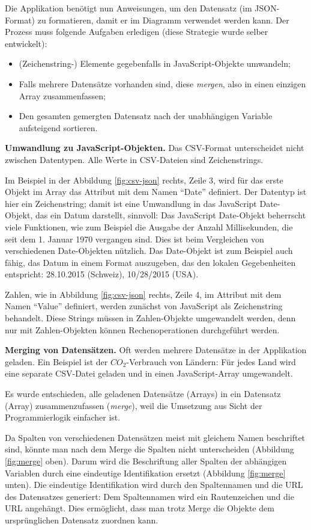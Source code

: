 Die Applikation benötigt nun Anweisungen, um den Datensatz (im JSON-Format) zu formatieren, damit er im Diagramm verwendet werden kann. Der Prozess muss folgende Aufgaben erledigen (diese Strategie wurde selber entwickelt):

\begin{itemize}
	\item (Zeichenstring-) Elemente gegebenfalls in JavaScript-Objekte umwandeln;
	\item Falls mehrere Datensätze vorhanden sind, diese \textit{mergen}, also in einen einzigen Array zusammenfassen;
	\item Den gesamten gemergten Datensatz nach der unabhängigen Variable aufsteigend sortieren.
\end{itemize}

\textbf{Umwandlung zu JavaScript-Objekten.} Das CSV-Format unterscheidet nicht zwischen Datentypen. Alle Werte in CSV-Dateien sind Zeichenstrings.

Im Beispiel in der Abbildung \ref{fig:csv-json} rechts, Zeile 3, wird für das erste Objekt im Array das Attribut mit dem Namen "`Date"' definiert. Der Datentyp ist hier ein Zeichenstring; damit ist eine Umwandlung in das JavaScript Date-Objekt, das ein Datum darstellt, sinnvoll: Das JavaScript Date-Objekt beherrscht viele Funktionen, wie zum Beispiel die Ausgabe der Anzahl Millisekunden, die seit dem 1. Januar 1970 vergangen sind. Dies ist beim Vergleichen von verschiedenen Date-Objekten nützlich. Das Date-Objekt ist zum Beispiel auch fähig, das Datum in einem Format auszugeben, das den lokalen Gegebenheiten entspricht: 28.10.2015 (Schweiz), 10/28/2015 (USA).

Zahlen, wie in Abbildung \ref{fig:csv-json} rechts, Zeile 4, im Attribut mit dem Namen "`Value"' definiert, werden zunächst von JavaScript als Zeichenstring behandelt. Diese Strings müssen in Zahlen-Objekte umgewandelt werden, denn nur mit Zahlen-Objekten können Rechenoperationen durchgeführt werden.

\textbf{Merging von Datensätzen.} Oft werden mehrere Datensätze in der Applikation geladen. Ein Beispiel ist der $CO_2$-Verbrauch von Ländern: Für jedes Land wird eine separate CSV-Datei geladen und in einen JavaScript-Array umgewandelt.

Es wurde entschieden, alle geladenen Datensätze (Arrays) in ein Datensatz (Array) zusammenzufassen (\textit{merge}), weil die Umsetzung aus Sicht der Programmierlogik einfacher ist. 

Da Spalten von verschiedenen Datensätzen meist mit gleichem Namen beschriftet sind, könnte man nach dem Merge die Spalten nicht unterscheiden (Abbildung \ref{fig:merge} oben). Darum wird die Beschriftung aller Spalten der abhängigen Variablen durch eine eindeutige Identifikation ersetzt (Abbildung \ref{fig:merge} unten). Die eindeutige Identifikation wird durch den Spaltennamen und die URL des Datensatzes generiert: Dem Spaltennamen wird ein Rautenzeichen und die URL angehängt. Dies ermöglicht, dass man trotz Merge die Objekte dem ursprünglichen Datensatz zuordnen kann.

